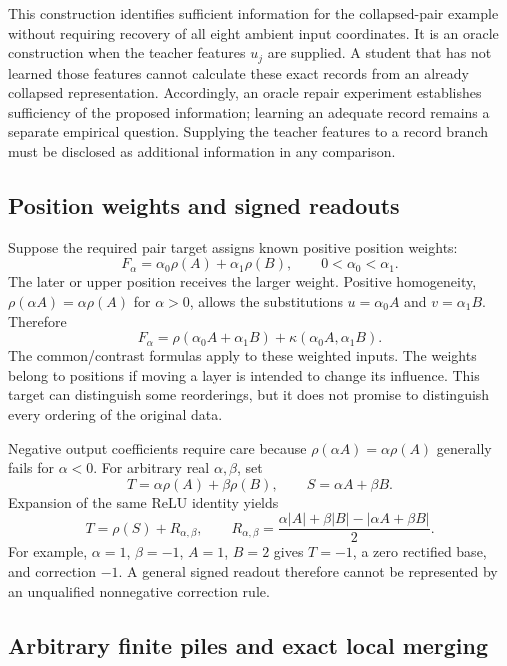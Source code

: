This construction identifies sufficient information for the collapsed-pair
example without requiring recovery of all eight ambient input coordinates.
It is an oracle construction when the teacher features $u_j$ are supplied.
A student that has not learned those features cannot calculate these exact
records from an already collapsed representation. Accordingly, an oracle
repair experiment establishes sufficiency of the proposed information;
learning an adequate record remains a separate empirical question. Supplying
the teacher features to a record branch must be disclosed as additional
information in any comparison.

\subsection{Position weights and signed readouts}
\label{loc:weights}

Suppose the required pair target assigns known positive position weights:
\[
 F_\alpha=\alpha_0\rho(A)+\alpha_1\rho(B),
 \qquad 0<\alpha_0<\alpha_1.
\]
The later or upper position receives the larger weight. Positive homogeneity,
$\rho(\alpha A)=\alpha\rho(A)$ for $\alpha>0$, allows the substitutions
$u=\alpha_0A$ and $v=\alpha_1B$. Therefore
\begin{equation}
 F_\alpha=
 \rho(\alpha_0A+\alpha_1B)+\kappa(\alpha_0A,\alpha_1B).
 \label{loc:ordered_pair}
\end{equation}
The common/contrast formulas apply to these weighted inputs. The weights
belong to positions if moving a layer is intended to change its influence.
This target can distinguish some reorderings, but it does not promise to
distinguish every ordering of the original data.

Negative output coefficients require care because
$\rho(\alpha A)=\alpha\rho(A)$ generally fails for $\alpha<0$.
For arbitrary real $\alpha,\beta$, set
\[
 T=\alpha\rho(A)+\beta\rho(B),\qquad S=\alpha A+\beta B.
\]
Expansion of the same ReLU identity yields
\begin{equation}
 T=\rho(S)+R_{\alpha,\beta},\qquad
 R_{\alpha,\beta}
 =\frac{\alpha|A|+\beta|B|-|\alpha A+\beta B|}{2}.
 \label{loc:signed_pair}
\end{equation}
For example, $\alpha=1$, $\beta=-1$, $A=1$, $B=2$ gives $T=-1$, a zero
rectified base, and correction $-1$. A general signed readout therefore
cannot be represented by an unqualified nonnegative correction rule.

\subsection{Arbitrary finite piles and exact local merging}
\label{loc:multiple}

